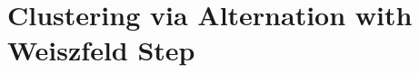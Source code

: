 \documentclass[11pt]{article}
\numberwithin{equation}{section}
\begin{document}
\section{Clustering via Alternation with Weiszfeld Step}

%
%
\end{document}
